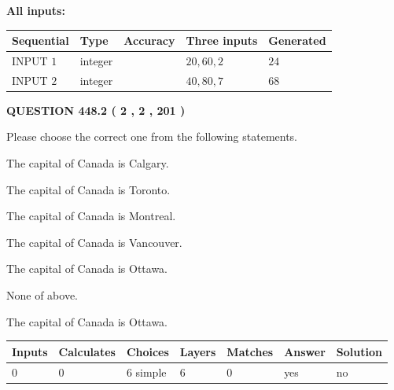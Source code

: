 \documentclass[12pt]{article}
\begin{document}
   
   
   
\noindent\vspace{0.1in}\hspace{-0.08in} {\textbf{\Large{All inputs: }}}
   
   
  
  
\noindent\begin{tabular}{|l|l|l|l|l|}
\hline
 Sequential & Type & Accuracy & Three inputs & Generated \\ 
\hline
 
 
  INPUT $  1 $ & integer &  & $
 20
 , 
 60
 , 
 2
 $ & $ 24 $ 
 \\  \hline  
 
 
  INPUT $  2 $ & integer &  & $
 40
 , 
 80
 , 
 7
 $ & $ 68 $ 
 \\  \hline  
 \end{tabular}
   
   
  
\vspace{0.2in}
  
{\textbf{\Large{QUESTION
448.2 
 ( 2 , 2 , 201 )
}}}
  
  
Please choose the correct one from the following statements.
 
 
The capital of Canada is Calgary.
 
 
The capital of Canada is Toronto.
 
 
The capital of Canada is Montreal.
 
 
The capital of Canada is Vancouver.
 
 
The capital of Canada is Ottawa.
 
 
 None of above.
 
 
\noindent{}
 
 
The capital of Canada is Ottawa.
 
 
\noindent{}
 
 
   
   
   
   
\noindent\begin{tabular}{|l|l|l|l|l|l|l|}
 \hline
Inputs & Calculates & Choices & Layers & Matches & Answer & Solution \\ \hline
 0  & 
 0  & 
 6
  simple  
  & 
 6  & 
 0  & 
  yes & 
  no 
  \\ \hline
 \end{tabular}
   
\end{document}
